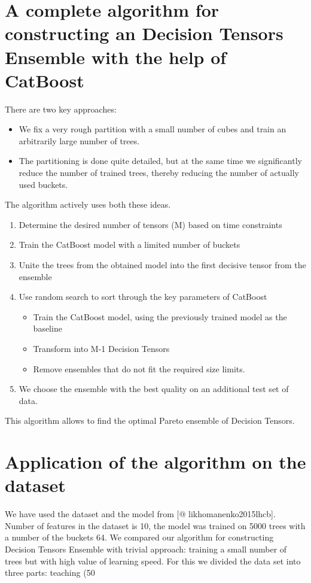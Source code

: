 \documentclass[a4paper]{jpconf}
\begin{document}
\section{A complete algorithm for constructing an Decision Tensors Ensemble with the help of CatBoost}

There are two key approaches:

\medskip
\begin{itemize}
\item We fix a very rough partition with a small number of cubes and train an arbitrarily large number of trees.
\item The partitioning is done quite detailed, but at the same time we significantly reduce the number of trained trees, thereby reducing the number of actually used buckets.
\end{itemize}

The algorithm actively uses both these ideas.

\medskip
\renewcommand{\theenumi}{\arabic{enumi}}
\begin{enumerate}
\item Determine the desired number of tensors (M) based on time constraints
\item Train the CatBoost model with a limited number of buckets
\item Unite the trees from the obtained model into the first decisive tensor from the ensemble
\item Use random search to sort through the key parameters of CatBoost
\medskip
\begin{itemize}
\item Train the CatBoost model, using the previously trained model as the baseline
\item Transform into M-1 Decision Tensors
\item Remove ensembles that do not fit the required size limits.
\end{itemize}
\item We choose the ensemble with the best quality on an additional test set of data.
\end{enumerate}

This algorithm allows to find the optimal Pareto ensemble of Decision Tensors.

\section{Application of the algorithm on the dataset}

We have used the dataset and the model from [@ likhomanenko2015lhcb]. Number of features in the dataset is 10, the model was trained on 5000 trees with a number of the buckets 64. We compared our algorithm for constructing Decision Tensors Ensemble with trivial approach: training a small number of trees but with high value of learning speed.
For this we divided the data set into three parts: teaching (50%
\end{document}
